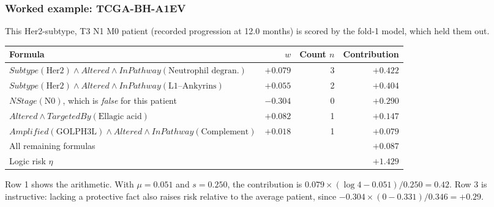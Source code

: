 \documentclass[11pt,a4paper]{article}
\newcommand{\pred}[1]{\mathit{#1}}
\begin{document}
\subsubsection{Worked example: TCGA-BH-A1EV}
This Her2-subtype, T3 N1 M0 patient (recorded progression at 12.0 months) is scored by the fold-1 model, which held them out.
\begin{center}
\small
\begin{tabular}{p{7.0cm}rrr}
\toprule
Formula & $w$ & Count $n$ & Contribution \\
\midrule
$\pred{Subtype}(\text{Her2})\wedge\pred{Altered}\wedge\pred{InPathway}(\text{Neutrophil degran.})$ & $+0.079$ & 3 & $+0.422$ \\
$\pred{Subtype}(\text{Her2})\wedge\pred{Altered}\wedge\pred{InPathway}(\text{L1--Ankyrins})$ & $+0.055$ & 2 & $+0.404$ \\
$\pred{NStage}(\mathrm{N0})$, which is \emph{false} for this patient & $-0.304$ & 0 & $+0.290$ \\
$\pred{Altered}\wedge\pred{TargetedBy}(\text{Ellagic acid})$ & $+0.082$ & 1 & $+0.147$ \\
$\pred{Amplified}(\text{GOLPH3L})\wedge\pred{Altered}\wedge\pred{InPathway}(\text{Complement})$ & $+0.018$ & 1 & $+0.079$ \\
All remaining formulas & & & $+0.087$ \\
\midrule
Logic risk $\eta$ & & & $\mathbf{+1.429}$ \\
\bottomrule
\end{tabular}
\end{center}
Row 1 shows the arithmetic. With $\mu=0.051$ and $s=0.250$, the contribution is $0.079\times(\log 4-0.051)/0.250=0.42$. Row 3 is instructive: lacking a protective fact also raises risk relative to the average patient, since $-0.304\times(0-0.331)/0.346=+0.29$.
\end{document}
